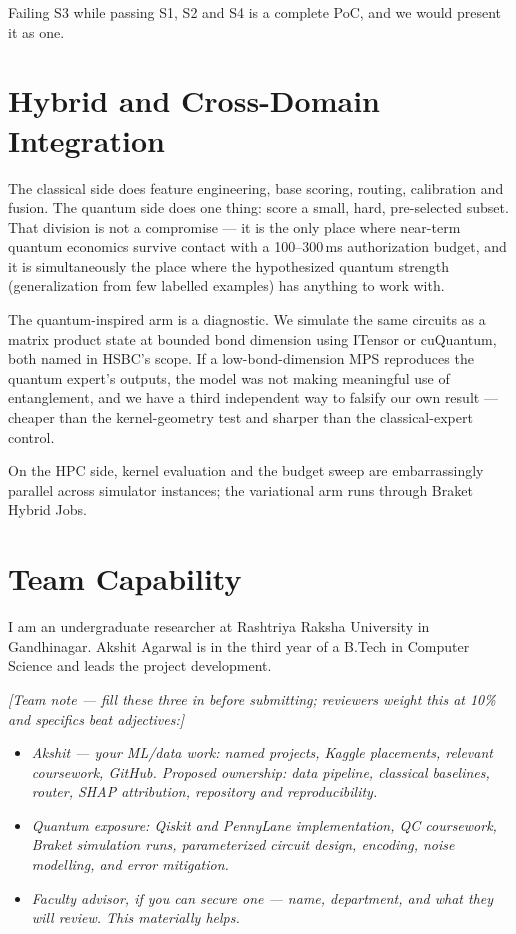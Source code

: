 \documentclass[10pt,a4paper]{article}
\begin{document}
Failing S3 while passing S1, S2 and S4 is a complete PoC, and we would present it as one.

\section{Hybrid and Cross-Domain Integration}

The classical side does feature engineering, base scoring, routing, calibration and fusion. The quantum side does one thing: score a small, hard, pre-selected subset. That division is not a compromise --- it is the only place where near-term quantum economics survive contact with a 100--300\,ms authorization budget, and it is simultaneously the place where the hypothesized quantum strength (generalization from few labelled examples) has anything to work with.

The quantum-inspired arm is a diagnostic. We simulate the same circuits as a matrix product state at bounded bond dimension using ITensor or cuQuantum, both named in HSBC's scope. If a low-bond-dimension MPS reproduces the quantum expert's outputs, the model was not making meaningful use of entanglement, and we have a third independent way to falsify our own result --- cheaper than the kernel-geometry test and sharper than the classical-expert control.

On the HPC side, kernel evaluation and the budget sweep are embarrassingly parallel across simulator instances; the variational arm runs through Braket Hybrid Jobs.

\section{Team Capability}

I am an undergraduate researcher at Rashtriya Raksha University in Gandhinagar. Akshit Agarwal is in the third year of a B.Tech in Computer Science and leads the project development.

\emph{[Team note --- fill these three in before submitting; reviewers weight this at 10\% and specifics beat adjectives:]}
\begin{itemize}
\item \emph{Akshit --- your ML/data work: named projects, Kaggle placements, relevant coursework, GitHub. Proposed ownership: data pipeline, classical baselines, router, SHAP attribution, repository and reproducibility.}
\item \emph{Quantum exposure: Qiskit and PennyLane implementation, QC coursework, Braket simulation runs, parameterized circuit design, encoding, noise modelling, and error mitigation.}
\item \emph{Faculty advisor, if you can secure one --- name, department, and what they will review. This materially helps.}
\end{itemize}
\end{document}
